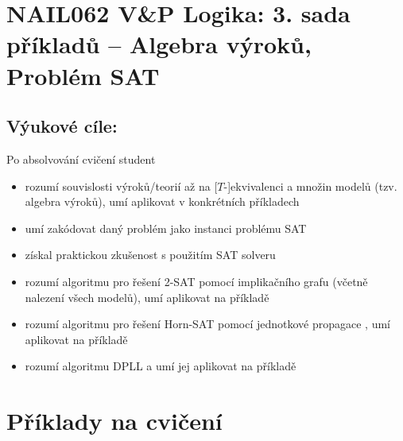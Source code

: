 \section*{NAIL062 V\&P Logika: 3. sada příkladů -- Algebra výroků, Problém SAT}

\subsection*{Výukové cíle:} Po absolvování cvičení student

    \begin{itemize}\setlength{\itemsep}{0pt}
        \item rozumí souvislosti výroků/teorií až na [$T$-]ekvivalenci a množin modelů (tzv. algebra výroků), umí aplikovat v konkrétních příkladech
        \item umí zakódovat daný problém jako instanci problému SAT
        \item získal praktickou zkušenost s použitím SAT solveru
        \item rozumí algoritmu pro řešení 2-SAT pomocí implikačního grafu (včetně nalezení všech modelů), umí aplikovat na příkladě
        \item rozumí algoritmu pro řešení Horn-SAT pomocí jednotkové propagace , umí aplikovat na příkladě
        \item rozumí algoritmu DPLL a umí jej aplikovat na příkladě
    \end{itemize}

\section*{Příklady na cvičení}


